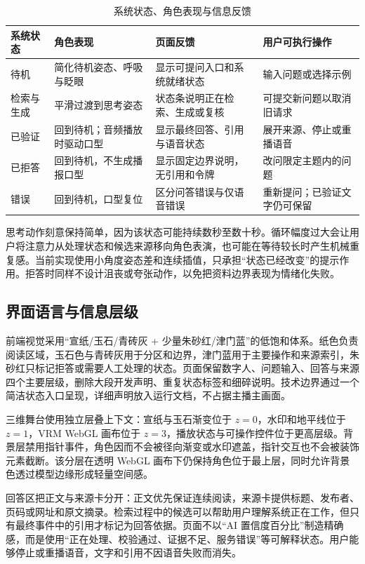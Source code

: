 \documentclass[UTF8,zihao=-4,fontset=none,twoside]{ctexart}
\begin{document}
\begin{table}[htbp]
\centering
\caption{系统状态、角色表现与信息反馈}
\label{tab:interaction-states}
\small
\begin{tabularx}{\linewidth}{@{}P{22mm}P{30mm}Y Y@{}}
\toprule
系统状态 & 角色表现 & 页面反馈 & 用户可执行操作 \\
\midrule
待机 & 简化待机姿态、呼吸与眨眼 & 显示可提问入口和系统就绪状态 & 输入问题或选择示例 \\
检索与生成 & 平滑过渡到思考姿态 & 状态条说明正在检索、生成或复核 & 可提交新问题以取消旧请求 \\
已验证 & 回到待机；音频播放时驱动口型 & 显示最终回答、引用与语音状态 & 展开来源、停止或重播语音 \\
已拒答 & 回到待机，不生成播报口型 & 显示固定边界说明，无引用和令牌 & 改问限定主题内的问题 \\
错误 & 回到待机，口型复位 & 区分问答错误与仅语音错误 & 重新提问；已验证文字仍可保留 \\
\bottomrule
\end{tabularx}
\end{table}

思考动作刻意保持简单，因为该状态可能持续数秒至数十秒。循环幅度过大会让用户将注意力从处理状态和候选来源移向角色表演，也可能在等待较长时产生机械重复感。当前实现使用小角度姿态差和连续插值，只承担“状态已经改变”的提示作用。拒答时同样不设计沮丧或夸张动作，以免把资料边界表现为情绪化失败。

\subsection{界面语言与信息层级}

前端视觉采用“宣纸/玉石/青砖灰 + 少量朱砂红/津门蓝”的低饱和体系。纸色负责阅读区域，玉石色与青砖灰用于分区和边界，津门蓝用于主要操作和来源索引，朱砂红只标记拒答或需要人工处理的状态。页面保留数字人、问题输入、回答与来源四个主要层级，删除大段开发声明、重复状态标签和细碎说明。技术边界通过一个简洁状态入口呈现，详细声明放入运行文档，不占据主播主画面。

三维舞台使用独立层叠上下文：宣纸与玉石渐变位于 $z=0$，水印和地平线位于 $z=1$，VRM WebGL 画布位于 $z=3$，播放状态与可操作控件位于更高层级。背景层禁用指针事件，角色因而不会被径向渐变或水印遮盖，指针交互也不会被装饰元素截断。该分层在透明 WebGL 画布下仍保持角色位于最上层，同时允许背景色透过模型边缘形成轻量空间感。

回答区把正文与来源卡分开：正文优先保证连续阅读，来源卡提供标题、发布者、页码或网址和原文摘录。检索过程中的候选可以帮助用户理解系统正在工作，但只有最终事件中的引用才标记为回答依据。页面不以“AI 置信度百分比”制造精确感，而是使用“正在处理、校验通过、证据不足、服务错误”等可解释状态。用户能够停止或重播语音，文字和引用不因语音失败而消失。
\end{document}
